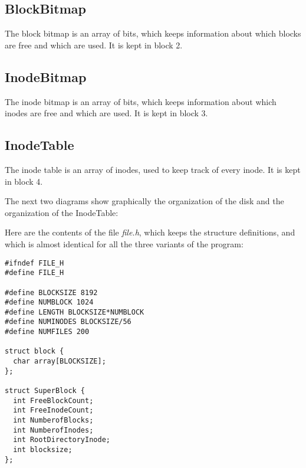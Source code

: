 \documentclass{article}
\begin{document}
\begin{flushleft}
\begin{itemize}
\end{itemize}


\subsection*{BlockBitmap}

The block bitmap is an array of bits, which keeps information about which 
blocks are free and which are used. It is kept in block 2.


\subsection*{InodeBitmap}

The inode bitmap is an array of bits, which keeps information about which 
inodes are free and which are used. It is kept in block 3.


\subsection*{InodeTable}
The inode table is an array of inodes, used to keep track of every inode.
It is kept in block 4.

\vspace{0.2in}
The next two diagrams show graphically the organization of the disk and 
the organization of the InodeTable:

\vspace{0.2in}

\begin{center}
\epsfxsize=5.5in

\epsfxsize=3in
\end{center}

\vspace{0.1in}
Here are the contents of the file {\it file.h}, which keeps the structure 
definitions, and which is almost identical for all the three variants of 
the program:

\begin{verbatim}
#ifndef FILE_H
#define FILE_H

#define BLOCKSIZE 8192
#define NUMBLOCK 1024
#define LENGTH BLOCKSIZE*NUMBLOCK
#define NUMINODES BLOCKSIZE/56
#define NUMFILES 200

struct block {
  char array[BLOCKSIZE];
};

struct SuperBlock {
  int FreeBlockCount;
  int FreeInodeCount;
  int NumberofBlocks;
  int NumberofInodes;
  int RootDirectoryInode;
  int blocksize;
};


\end{verbatim}
\end{flushleft}
\end{document}
